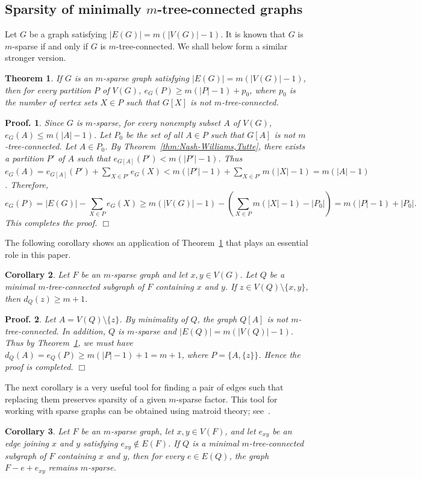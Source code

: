 \documentclass[10pt,bezier]{article}
\newtheorem{prethm}{{\bf Theorem}}[section]
\newenvironment{thm}{\begin{prethm}{\hspace{-0.5
em}{\bf.}}}{\end{prethm}}
\newtheorem{precor}[prethm]{{\bf Corollary}}
\newenvironment{cor}{\begin{precor}{\hspace{-0.5
em}{\bf.}}}{\end{precor}}
\newtheorem{preproof}{{\bf Proof.}}
\newenvironment{proof}[1]{\begin{preproof}{\rm
#1}\hfill{$\Box$}}{\end{preproof}}
\begin{document}
\subsection{Sparsity of minimally $m$-tree-connected graphs}
%
%
Let $G$ be a graph satisfying $|E(G)| = m(|V(G)|-1)$.
It is known that $G$ is $m$-sparse if and only if $G$ is $m$-tree-connected. 
We shall below form a similar stronger version. 
%
%
\begin{thm}\label{thm:sparse-partition-connected}
{If $G$ is an $m$-sparse graph satisfying $|E(G)| = m(|V(G)|-1)$, 
then for every partition $P$ of $V(G)$,
$e_G(P)\ge m(|P|-1)+p_0$, where $p_0$ is the number of vertex sets $X\in P$ such that $G[X]$ is not $m$-tree-connected.
}\end{thm}
%
\begin{proof}
{Since $G$ is $m$-sparse, for every nonempty subset $A$ of $V(G)$, $e_G(A)\le m(|A|-1)$. 
Let $P_0$ be the set of all $A\in P$ such that $G[A]$ is not $m$-tree-connected.
Let $A\in P_0$.
By Theorem~\ref{thm:Nash-Williams,Tutte}, there exists a partition $P'$ of $A$ such that $e_{G[A]}(P')<m(|P'|-1)$. Thus $e_{G}(A)=e_{G[A]}(P')+\sum_{X\in P'}e_{G}(X)<m(|P'|-1)+ \sum_{X\in P'}m(|X|-1)=m(|A|-1)$. Therefore, 
$$e_G(P)=|E(G)|-\sum_{X\in P}e_G(X)\ge m(|V(G)|-1)-(\sum_{X\in P}m(|X|-1)-|P_0|)= m(|P|-1)+|P_0|.$$
This completes the proof.
}\end{proof}
%
%
The following corollary shows an application of Theorem~\ref{thm:sparse-partition-connected} that plays an essential role in this paper.
%
\begin{cor}\label{cor:Q:lowerbound}
{Let $F$ be an $m$-sparse graph and let $x,y\in V(G)$. 
Let $Q$ be a minimal $m$-tree-connected subgraph of $F$ containing $x$ and $y$. If $z\in V(Q)\setminus \{x,y\}$, then
$d_Q(z)\ge m+1$.
}\end{cor}
\begin{proof}
{Let $A=V(Q)\setminus \{z\}$.
By minimality of $Q$, the graph $Q[A]$ is not $m$-tree-connected.
In addition, $Q$ is $m$-sparse and $|E(Q)|=m(|V(Q)|-1)$.
Thus by Theorem~\ref{thm:sparse-partition-connected}, we must have
$d_Q(A)=e_Q(P)\ge m(|P|-1)+1= m+1$, where $P=\{A, \{z\}\}$.
Hence the proof is completed.
}\end{proof}
%
%
The next corollary is a very useful tool for finding a pair of edges such that replacing
them preserves sparsity of a given $m$-sparse factor. 
This tool for working with sparse graphs can be obtained using matroid theory; see~\cite{Edmonds-1970}. 
%
\begin{cor}\label{cor:xGy-exchange}
{Let $F$ be an $m$-sparse graph, let $x,y\in V(F)$, and let $e_{xy}$ be an edge joining $x$ and $y$ satisfying $e_{xy}\not \in E(F)$. 
If $Q$ is a minimal $m$-tree-connected subgraph of $F$ containing $x$ and $y$, then for every $e \in E(Q)$, the graph $F-e+e_{xy}$ remains $m$-sparse.
}\end{cor}
\end{document}
